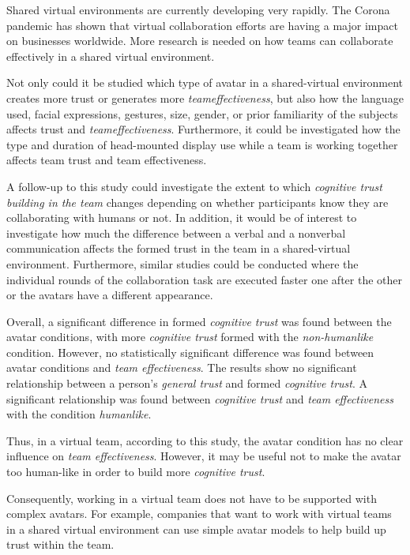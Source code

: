 \documentclass[sigchi]{acmart}
\begin{document}
Shared virtual environments are currently developing very rapidly. The Corona pandemic has shown that virtual collaboration efforts are having a major impact on businesses worldwide. More research is needed on how teams can collaborate effectively in a shared virtual environment.

Not only could it be studied which type of avatar in a shared-virtual environment creates more trust or generates more \textit{teameffectiveness}, but also how the language used, facial expressions, gestures, size, gender, or prior familiarity of the subjects affects trust and \textit{teameffectiveness}.
Furthermore, it could be investigated how the type and duration of head-mounted display use while a team is working together affects team trust and team effectiveness.

A follow-up to this study could investigate the extent to which \textit{cognitive trust building in the team} changes depending on whether participants know they are collaborating with humans or not. In addition, it would be of interest to investigate how much the difference between a verbal and a nonverbal communication affects the formed trust in the team in a shared-virtual environment.  
Furthermore, similar studies could be conducted where the individual rounds of the collaboration task are executed faster one after the other or the avatars have a different appearance.

Overall, a significant difference in formed \textit{cognitive trust} was found between the avatar conditions, with more \textit{cognitive trust} formed with the \textit{non-humanlike} condition. However, no statistically significant difference was found between avatar conditions and \textit{team effectiveness}. The results show no significant relationship between a person's \textit{general trust} and formed \textit{cognitive trust}. A significant relationship was found between \textit{cognitive trust} and \textit{team effectiveness} with the condition \textit{humanlike}.

Thus, in a virtual team, according to this study, the avatar condition has no clear influence on \textit{team effectiveness}. However, it may be useful not to make the avatar too human-like in order to build more \textit{cognitive trust}.

Consequently, working in a virtual team does not have to be supported with complex avatars. For example, companies that want to work with virtual teams in a shared virtual environment can use simple avatar models to help build up trust within the team.





\appendix
\end{document}
